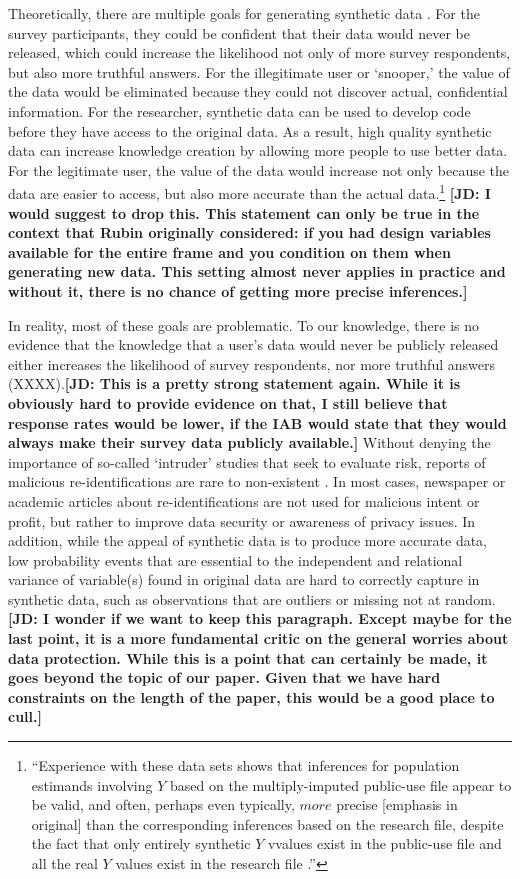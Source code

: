 \documentclass[runningheads]{llncs}
\newcommand{\jd}[1]{\scriptsize {\bf \color{red}[JD: #1]}\normalsize}
\begin{document}
Theoretically, there are multiple goals for generating synthetic data \cite{rubin1993statistical}.  For the survey participants, they could be confident that their data would never be released, which could increase the likelihood not only of more survey respondents, but also more truthful answers.  For the illegitimate user or `snooper,' the value of the data would be eliminated because they could not discover actual, confidential information.  For the researcher, synthetic data can be used to develop code before they have access to the original data.  As a result, high quality synthetic data can increase knowledge creation by allowing more people to use better data.  For the legitimate user, the value of the data would increase not only because the data are easier to access, but also more accurate than the actual data.\footnote{``Experience with these data sets shows that inferences for population estimands involving $Y$ based on the multiply-imputed public-use file appear to be valid, and often, perhaps even typically, $more$ precise [emphasis in original] than the corresponding inferences based on the research file, despite the fact that only entirely synthetic $Y$ vvalues exist in the public-use file and all the real $Y$ values exist in the research file \cite[pg. 466]{rubin1993statistical}.''} \jd{I would suggest to drop this. This statement can only be true in the context that Rubin originally considered: if you had design variables available for the entire frame and you condition on them when generating new data. This setting almost never applies in practice and without it, there is no chance of getting more precise inferences.} 

In reality, most of these goals are problematic.  To our knowledge, there is no evidence that the knowledge that a user's data would never be publicly released either increases the likelihood of survey respondents, nor more truthful answers (XXXX).\jd{This is a pretty strong statement again. While it is obviously hard to provide evidence on that, I still believe that response rates would be lower, if the IAB would state that they would always make their survey data publicly available.}  Without denying the importance of so-called `intruder' studies that seek to evaluate risk, reports of malicious re-identifications are rare to non-existent \cite{francis_wagner_yyyy}.  In most cases, newspaper or academic articles about re-identifications are not used for malicious intent or profit, but rather to improve data security or awareness of privacy issues.  In addition, while the appeal of synthetic data is to produce more accurate data, low probability events that are essential to the independent and relational variance of variable(s) found in original data are hard to correctly capture in synthetic data, such as observations that are outliers or missing not at random. \jd{I wonder if we want to keep this paragraph. Except maybe for the last point, it is a more fundamental critic on the general worries about data protection. While this is a point that can certainly be made, it goes beyond the topic of our paper. Given that we have hard constraints on the length of the paper, this would be a good place to cull.}  
\end{document}
